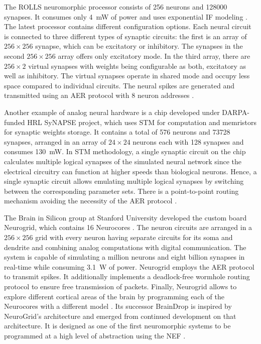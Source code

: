 The \ac{ROLLS} neuromorphic processor consists of \num{256} neurons and \num{128000} synapses.
It consumes only \SI{4}{\milli\watt} of power and uses exponential \ac{IF} modeling \parencite{Qiao2015}.
The latest processor contains different configuration options.
Each neural circuit is connected to three different types of synaptic circuits: the first is an array of $256\times256$ synapse, which can be excitatory or inhibitory.
The synapses in the second $256\times256$ array offers only excitatory mode.
In the third array, there are $256\times2$ virtual synapses with weights being configurable as both, excitatory as well as inhibitory.
The virtual synapses operate in shared mode and occupy less space compared to individual circuits.
The neural spikes are generated and transmitted using an \ac{AER} protocol with \SI{8}{\bit} neuron addresses \parencite{Qiao2015}.

Another example of analog neural hardware is a chip \parencite{Srinivasa2012} developed under \ac{DARPA}-funded \ac{HRL} \ac{SyNAPSE} project, which uses \ac{STM} for computation and memristors for synaptic weights storage.
It contains a total of \num{576} neurons and \num{73728} synapses, arranged in an array of $24\times24$ neurons each with \num{128} synapses and consumes \SI{130}{\milli\watt}.
In \ac{STM} methodology, a single synaptic circuit on the chip calculates multiple logical synapses of the simulated neural network since the electrical circuitry can function at higher speeds than biological neurons.
Hence, a single synaptic circuit allows emulating multiple logical synapses by switching between the corresponding parameter sets.
There is a point-to-point routing mechanism avoiding the necessity of the \ac{AER} protocol \parencite{Walter2015}. 

The Brain in Silicon group at Stanford University developed the custom board Neurogrid, which contains \num{16} Neurocores \parencite{Benjamin2014, Choudhary2012}.
The neuron circuits are arranged in a $256\times256$ grid with every neuron having separate circuits for its soma and  dendrite and combining analog computations with digital communication.
The system is capable of simulating a million neurons and eight billion synapses in real-time while consuming \SI{3.1}{\watt} of power.
Neurogrid employs the \ac{AER} protocol to transmit spikes.
It additionally implements a deadlock-free wormhole routing protocol to ensure free transmission of packets.
Finally, Neurogrid allows to explore different cortical areas of the brain by programming each of the Neurocores with a different model \parencite{Merolla2014}.
Its successor BrainDrop \parencite{Neckar2019} is inspired by NeuroGrid's architecture and emerged from continued development on that architecture.
It is designed as one of the first neuromorphic systems to be programmed at a high level of abstraction using the \ac{NEF} \parencite{Eliasmith2003}.

